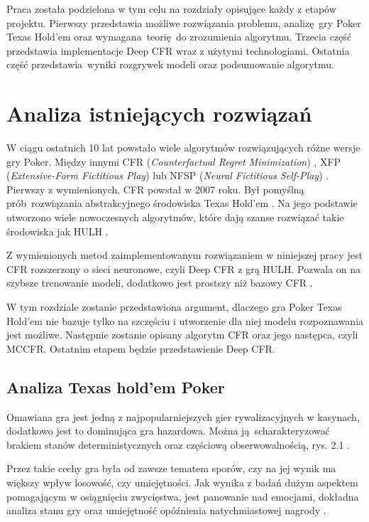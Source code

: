 \documentclass[12pt,oneside,a4paper]{report}
\begin{document}
Praca została podzielona w tym celu na rozdziały opisujące każdy z etapów projektu. Pierwszy przedstawia
możliwe rozwiązania problemu, analizę gry Poker Texas Hold'em oraz wymagana teorię do zrozumienia algorytmu.
Trzecia część przedstawia implementacje Deep CFR wraz z użytymi technologiami. Ostatnia część przedstawia wyniki
rozgrywek modeli oraz podsumowanie algorytmu.

\chapter{Analiza istniejących rozwiązań}

W ciągu ostatnich 10 lat powstało wiele algorytmów rozwiązujących różne wersje gry Poker.
Między innymi CFR (\emph{Counterfactual Regret Minimization}) \cite{CFR}, XFP (\emph{Extensive-Form
Fictitious Play}) \cite{XFP} lub
NFSP (\emph{Neural Fictitious Self-Play}) \cite{NFSP}.
Pierwszy z wymienionych, CFR powstał w 2007 roku. Był 
pomyślną prób rozwiązania abstrakcyjnego środowiska Texas Hold'em \cite{CFR}. 
Na jego podstawie utworzono wiele nowoczesnych
algorytmów, które dają szanse rozwiązać takie środowiska jak HULH \cite{CFR}.


Z wymienionych metod zaimplementowanym rozwiązaniem w niniejszej pracy jest CFR 
rozszerzony o sieci neuronowe,
czyli Deep CFR z grą HULH. Pozwala on na szybsze trenowanie modeli,
dodatkowo jest prostszy niż bazowy 
CFR \cite{DCFR}.

W tym rozdziale zostanie przedstawiona argument, dlaczego gra Poker Texas Hold'em nie bazuje
tylko na szczęściu i utworzenie dla niej modelu rozpoznawania jest możliwe.
Następnie zostanie opisany algorytm CFR oraz jego następca,
czyli MCCFR. Ostatnim etapem będzie przedstawienie Deep CFR.

\section{Analiza Texas hold'em Poker}

Omawiana gra jest jedną z najpopularniejszych gier rywalizacyjnych w kasynach, dodatkowo jest to
dominująca gra hazardowa. Można ją scharakteryzować brakiem stanów deterministycznych oraz częściową 
obserwowalnością, rys. 2.1 \cite{poker}.  


Przez takie cechy gra była od zawsze tematem sporów, czy na jej wynik ma większy wpływ
losowość, czy umiejętności. Jak wynika z badań dużym aspektem pomagającym w osiągnięciu zwycięstwa,
jest panowanie nad emocjami, dokładna analiza stanu gry oraz umiejętność opóźnienia natychmiastowej
nagrody \cite{theory poker}. 
\end{document}
